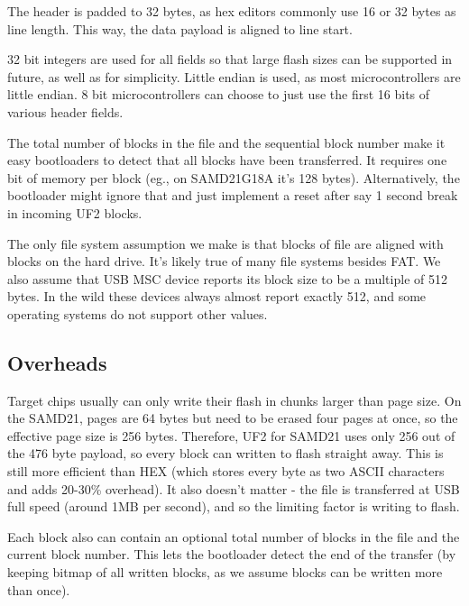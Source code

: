 The header is padded to 32 bytes, as hex editors commonly use 16 or 32 bytes as line length. 
This way, the data payload is aligned to line start.

32 bit integers are used for all fields so that large flash sizes can be supported in future, as well as for simplicity.
Little endian is used, as most microcontrollers are little endian. 8 bit microcontrollers can choose to just use the
first 16 bits of various header fields.

The total number of blocks in the file and the sequential block number make it easy 
bootloaders to detect that all blocks have been transferred. It requires one bit of 
memory per block (eg., on SAMD21G18A it's 128 bytes). Alternatively, the bootloader might
ignore that and just implement a reset after say 1 second break in incoming UF2 blocks.

The only file system assumption we make is that blocks of file are aligned with blocks on the hard drive. 
It's likely true of many file systems besides FAT. We also assume that USB MSC device reports its block 
size to be a multiple of 512 bytes. In the wild these devices always almost report exactly 512, and some 
operating systems do not support other values.

\subsection{Overheads}

Target chips usually can only write their flash in chunks larger than page size. On the SAMD21, pages are 64 bytes 
but need to be erased four pages at once, so the effective page size is 256 bytes. Therefore, UF2 for SAMD21 uses 
only 256 out of the 476 byte payload, so every block can written to flash straight away. This is still more 
efficient than HEX (which stores every byte as two ASCII characters and adds 20-30\% overhead). It also doesn’t 
matter - the file is transferred at USB full speed (around 1MB per second), and so the limiting factor is writing 
to flash.

Each block also can contain an optional total number of blocks in the file and the current block number. 
This lets the bootloader detect the end of the transfer (by keeping bitmap of all written blocks, 
as we assume blocks can be written more than once).


